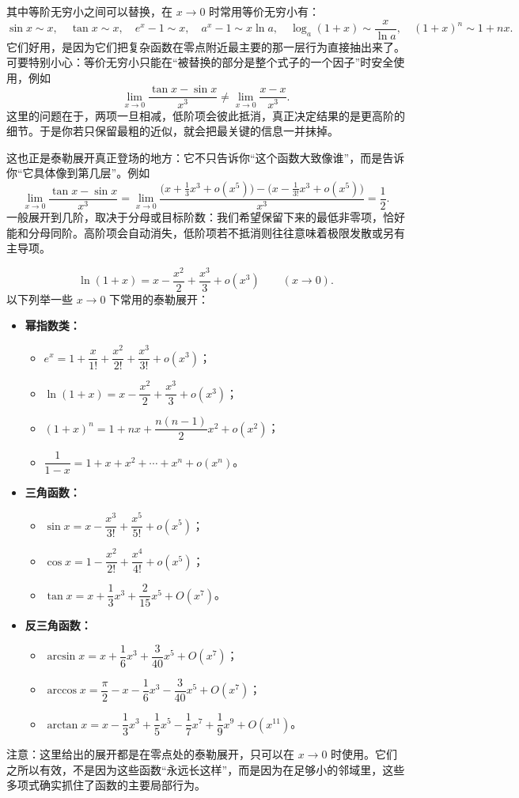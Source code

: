 \documentclass[UTF8]{ctexbook}
\begin{document}
其中等阶无穷小之间可以替换，在 $x\to 0$ 时常用等价无穷小有：
\[
\sin x\sim x,\quad \tan x\sim x,\quad e^x-1\sim x,
\quad
 a^x-1\sim x\ln a,\quad \log_a(1+x)\sim \frac{x}{\ln a},
\quad
(1+x)^n\sim 1+nx.
\]
它们好用，是因为它们把复杂函数在零点附近最主要的那一层行为直接抽出来了。可要特别小心：等价无穷小只能在“被替换的部分是整个式子的一个因子”时安全使用，例如
\[
\lim_{x\to 0}\frac{\tan x-\sin x}{x^3}\ne \lim_{x\to 0}\frac{x-x}{x^3}.
\]
这里的问题在于，两项一旦相减，低阶项会彼此抵消，真正决定结果的是更高阶的细节。于是你若只保留最粗的近似，就会把最关键的信息一并抹掉。

这也正是泰勒展开真正登场的地方：它不只告诉你“这个函数大致像谁”，而是告诉你“它具体像到第几层”。例如
\[
\lim_{x\to 0}\frac{\tan x-\sin x}{x^3}
=
\lim_{x\to 0}\frac{\bigl(x+\tfrac{1}{3}x^3+o(x^5)\bigr)-\bigl(x-\tfrac{1}{3!}x^3+o(x^5)\bigr)}{x^3}
=\frac12.
\]
一般展开到几阶，取决于分母或目标阶数：我们希望保留下来的最低非零项，恰好能和分母同阶。高阶项会自动消失，低阶项若不抵消则往往意味着极限发散或另有主导项。

\[
\ln(1+x)=x-\frac{x^2}{2}+\frac{x^3}{3}+o(x^3)\qquad (x\to 0).
\]
以下列举一些 $x\to 0$ 下常用的泰勒展开：

\begin{itemize}
  \item \textbf{幂指数类：}
  \begin{itemize}
    \item $e^x=1+\dfrac{x}{1!}+\dfrac{x^2}{2!}+\dfrac{x^3}{3!}+o(x^3)$；
    \item $\ln(1+x)=x-\dfrac{x^2}{2}+\dfrac{x^3}{3}+o(x^3)$；
    \item $(1+x)^n=1+nx+\dfrac{n(n-1)}{2}x^2+o(x^2)$；
    \item $\dfrac{1}{1-x}=1+x+x^2+\cdots+x^n+o(x^n)$。
  \end{itemize}

  \item \textbf{三角函数：}
  \begin{itemize}
    \item $\sin x=x-\dfrac{x^3}{3!}+\dfrac{x^5}{5!}+o(x^5)$；
    \item $\cos x=1-\dfrac{x^2}{2!}+\dfrac{x^4}{4!}+o(x^5)$；
    \item $\tan x=x+\dfrac{1}{3}x^3+\dfrac{2}{15}x^5+O(x^7)$。
  \end{itemize}

  \item \textbf{反三角函数：}
  \begin{itemize}
    \item $\arcsin x=x+\dfrac{1}{6}x^3+\dfrac{3}{40}x^5+O(x^7)$；
    \item $\arccos x=\dfrac{\pi}{2}-x-\dfrac{1}{6}x^3-\dfrac{3}{40}x^5+O(x^7)$；
    \item $\arctan x=x-\dfrac{1}{3}x^3+\dfrac{1}{5}x^5-\dfrac{1}{7}x^7+\dfrac{1}{9}x^9+O(x^{11})$。
  \end{itemize}
\end{itemize}
注意：这里给出的展开都是在零点处的泰勒展开，只可以在 $x\to 0$ 时使用。它们之所以有效，不是因为这些函数“永远长这样”，而是因为在足够小的邻域里，这些多项式确实抓住了函数的主要局部行为。
\end{document}
